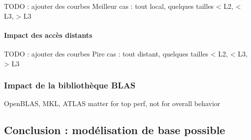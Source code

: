 TODO : ajouter des courbes
Meilleur cas : tout local, quelques tailles < L2, < L3, > L3

\paragraph{Impact des accès distants}

TODO : ajouter des courbes
Pire cas : tout distant, quelques tailles < L2, < L3, > L3

\subsubsection{Impact de la bibliothèque BLAS}

OpenBLAS, MKL, ATLAS
matter for top perf, not for overall behavior

\subsection{Conclusion : modélisation de base possible}

